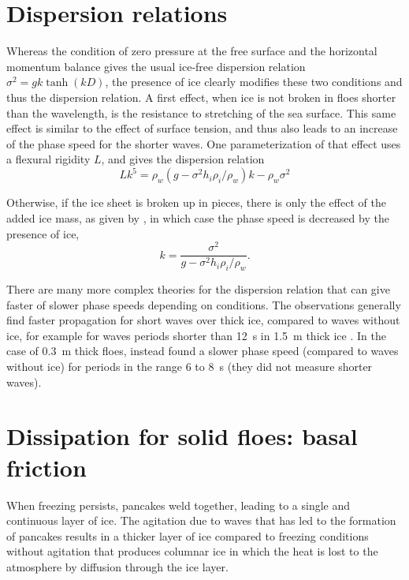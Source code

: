 \section{Dispersion relations}
Whereas the condition of zero pressure at the free surface  and the horizontal momentum balance gives the usual ice-free dispersion relation $\sigma^2 = g k \tanh(kD)$, the presence of ice clearly modifies these two conditions and thus the dispersion relation. A first effect, when ice is not broken in floes shorter than the wavelength, is the resistance to stretching of the sea surface. This same effect is similar to the effect of surface tension, and thus also leads to an increase of the phase speed for the shorter waves. 
One parameterization of that effect uses a flexural rigidity $L$, and gives the dispersion relation 
\begin{equation}
L k^5= \rho_w (g - \sigma^2 h_i  \rho_i/\rho_w )k - \rho_w \sigma^2
\end{equation}

 Otherwise, if the ice sheet is broken up in pieces, there is only the effect of the added ice mass, as given by \cite{Fox&Haskell2001}, in which case the phase speed is decreased by the presence of ice, 
\begin{equation}
k= \frac{\sigma^2}{g - \sigma^2 h_i  \rho_i/\rho_w }.
\end{equation}

There are many more complex theories for the dispersion relation \citep[e.g.][]{Meylan&al.2018} that can give faster of slower phase speeds depending on conditions.  The observations generally find faster propagation for short waves over thick ice, compared to waves without ice, for example for waves periods shorter than 12~s in 1.5~m thick ice \citep{Marsan&al.2012}. In the case of 0.3~m thick floes, \cite{Fox&Haskell2001} instead found a slower phase speed (compared to waves without ice) for periods in the range 6 to 8~s (they did not measure shorter waves).  

 
\section{Dissipation for solid floes: basal friction}
When freezing persists, pancakes weld together, leading to a single and continuous layer of ice. The agitation due to waves that has led to the formation of pancakes results in a thicker layer of ice compared to freezing conditions without agitation that produces columnar ice in which the heat is lost to the atmosphere by diffusion through the ice layer. 

